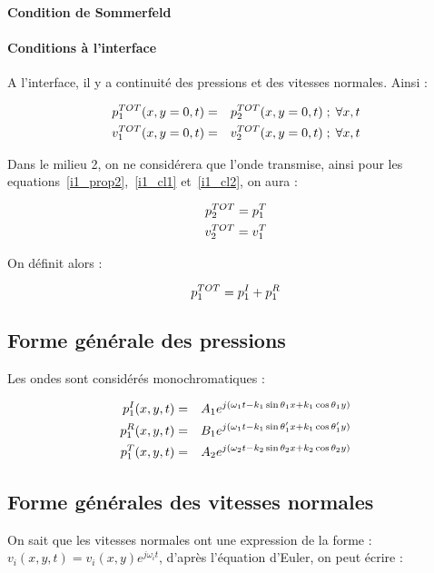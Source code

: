 \paragraph{Condition de Sommerfeld}

\paragraph{Conditions à l'interface}

A l'interface, il y a continuité des pressions et des vitesses normales. Ainsi :

\begin{eqnarray}
    p^{TOT}_1(x, y=0, t) &=& p^{TOT}_2(x,y=0,t) \;;\;\forall x,t \label{i1_cl1}\\
    v^{TOT}_1(x, y=0, t) &=& v^{TOT}_2(x,y=0,t) \;;\;\forall x,t \label{i1_cl2}
\end{eqnarray}

Dans le milieu 2, on ne considérera que l'onde transmise, ainsi pour les equations~\eqref{i1_prop2},~\eqref{i1_cl1}
et~\eqref{i1_cl2}, on aura :

\begin{eqnarray*}
    p^{TOT}_2 = p^T_1\\
    v^{TOT}_2 = v^T_1
\end{eqnarray*}

On définit alors :

$$p^{TOT}_1 = p^I_1 + p^R_1$$

\subsection{Forme générale des pressions}

Les ondes sont considérés monochromatiques :

\begin{eqnarray}
    p^I_1(x,y,t) & = & A_1e^{j(\omega_1t-k_1\sin\theta_1x+k_1\cos\theta_1y)} \label{i1_pgeni}\\
    p^R_1(x,y,t) & = & B_1e^{j(\omega_1t-k_1\sin\theta_1'x+k_1\cos\theta_1'y)} \label{i1_pgenr}\\
    p^T_1(x,y,t) & = & A_2e^{j(\omega_2t-k_2\sin\theta_2x+k_2\cos\theta_2y)} \label{i1_pgent}
\end{eqnarray}

\subsection{Forme générales des vitesses normales}

On sait que les vitesses normales ont une expression de la forme : $v_i(x,y,t) = v_i(x,y)e^{j\omega_it}$, d'après
l'équation d'Euler, on peut écrire :

